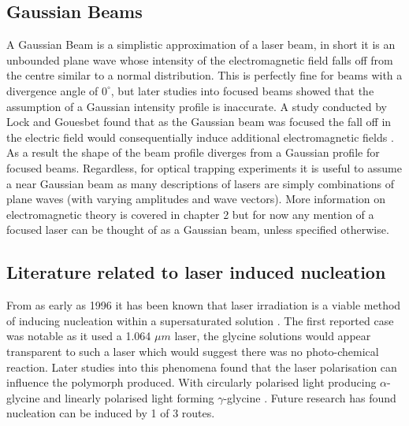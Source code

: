 \subsection{Gaussian Beams}
A Gaussian Beam is a simplistic approximation of a laser beam, in 
short it is an unbounded plane wave whose intensity of the 
electromagnetic field falls off from the centre similar to a normal distribution. This is perfectly fine for beams with a divergence 
angle of $0^{\circ}$, but later studies into focused beams showed 
that the assumption of a Gaussian intensity profile is inaccurate. 
A study conducted by Lock and Gouesbet found that as the Gaussian 
beam was focused the fall off in the electric field would 
consequentially induce additional electromagnetic fields 
\cite{Lock1994}. As a result the shape of the beam profile diverges 
from a Gaussian profile for focused beams. Regardless, for optical 
trapping experiments it is useful to assume a near Gaussian beam as 
many descriptions of lasers are simply combinations of plane waves 
(with varying amplitudes and wave vectors).  More information on 
electromagnetic theory is covered in chapter 2 but for now any 
mention of a focused laser can be thought of as a Gaussian beam, 
unless specified otherwise. 

\subsection{Literature related to laser induced nucleation}
From as early as 1996 it has been known that laser irradiation is a viable
method of inducing nucleation within a supersaturated solution
\cite{Garetz1996}. The first reported case was notable as it used a 
1.064 $\mu m$ laser, the glycine solutions would appear transparent to
such a laser which would suggest there was no photo-chemical reaction.
Later studies into this phenomena found that the laser polarisation 
can influence the polymorph produced. With circularly polarised light 
producing $\alpha$-glycine and linearly polarised light forming
$\gamma$-glycine \cite{Garetz2002}. Future research has found nucleation 
can be induced by 1 of 3 routes.

